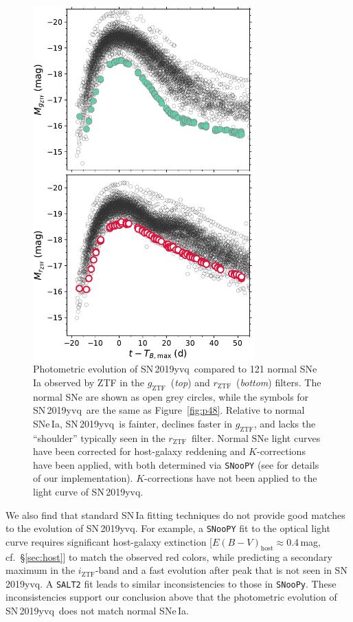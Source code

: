 \documentclass[twocolumn]{aastex63}
\newcommand{\rztf}{$r_\mathrm{ZTF}$}
\newcommand{\gztf}{$g_\mathrm{ZTF}$}
\newcommand{\iztf}{$i_\mathrm{ZTF}$}
\newcommand{\sn}{SN\,2019yvq}
\begin{document}
\begin{figure}
    \centering
    \includegraphics[width=3.35in]{./figures/abs_mag_host_ebv_kcorr.pdf}
    \caption{Photometric evolution of \sn\ compared to 121 normal SNe\,Ia
    observed by ZTF \citep{Yao19} in the \gztf\ (\textit{top}) and \rztf\
    (\textit{bottom}) filters. The normal SNe are shown as open grey circles,
    while the symbols for \sn\ are the same as Figure~\ref{fig:p48}. Relative
    to normal SNe\,Ia, \sn\ is fainter, declines faster in \gztf, and lacks
    the ``shoulder'' typically seen in the \rztf\ filter. Normal SNe light
    curves have been corrected for host-galaxy reddening and $K$-corrections
    have been applied, with both determined via \texttt{SNooPY} (see
    \citealt{Bulla20} for details of our implementation). $K$-corrections have
    not been applied to the light curve of \sn.}
    \label{fig:lc_comp}
\end{figure}


We also find that standard SN\,Ia fitting techniques do not provide good
matches to the evolution of \sn. For example, a \texttt{SNooPY}
\citep{Burns11} fit to the optical light curve requires significant
host-galaxy extinction [$E(B-V)_\mathrm{host}\approx0.4$\,mag, cf.\
\S\ref{sec:host}] to match the observed red colors, while predicting a
secondary maximum in the \iztf-band and a fast evolution after peak that is
not seen in \sn. A \texttt{SALT2} \citep{Guy07} fit leads to similar
inconsistencies to those in \texttt{SNooPy}. These inconsistencies support our
conclusion above that the photometric evolution of \sn\ does not match normal
SNe\,Ia.
\end{document}
